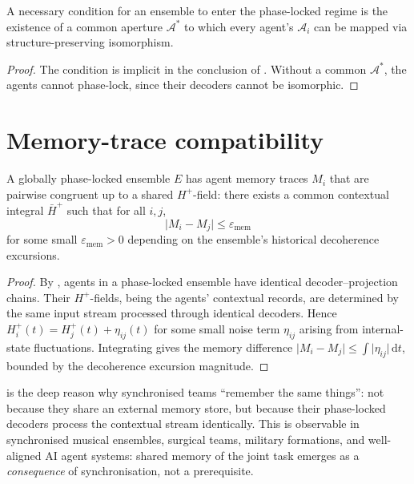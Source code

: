 \documentclass[11pt,twocolumn,a4paper]{article}
\newcommand{\Aper}{\mathcal{A}}
\newcommand{\eps}{\varepsilon}
\newcommand{\abs}[1]{\lvert#1\rvert}
\newcommand{\dd}{\,\mathrm{d}}
\begin{document}
\begin{corollary}\label{cor:aper-mediated}
A necessary condition for an ensemble to enter the phase-locked regime
is the existence of a common aperture
$\Aper^*$ to which every agent's $\Aper_i$ can be mapped via
structure-preserving isomorphism.
\end{corollary}

\begin{proof}
The condition is implicit in the conclusion of .
Without a common $\Aper^*$, the agents cannot phase-lock, since their
decoders cannot be isomorphic.
\end{proof}

\section{Memory-trace compatibility}
\label{sec:memory-compat}

\begin{theorem}\label{thm:mem-compat}
A globally phase-locked ensemble $E$ has agent memory traces $M_i$
that are pairwise congruent up to a shared $H^+$-field: there exists a
common contextual integral $\bar{H}^+$ such that for all $i,j$,
\[
\abs{M_i-M_j}\le\eps_{\mathrm{mem}}
\]
for some small $\eps_{\mathrm{mem}}>0$ depending on the ensemble's
historical decoherence excursions.
\end{theorem}

\begin{proof}
By , agents in a phase-locked ensemble have identical
decoder--projection chains. Their $H^+$-fields, being the agents'
contextual records, are determined by the same input stream
processed through identical decoders. Hence
$H^+_i(t)=H^+_j(t)+\eta_{ij}(t)$ for some small noise term $\eta_{ij}$
arising from internal-state fluctuations. Integrating gives the
memory difference $\abs{M_i-M_j}\le\int\abs{\eta_{ij}}\dd t$, bounded
by the decoherence excursion magnitude.
\end{proof}

\begin{remark}[Interpretation]\label{rem:mem-interp}
 is the deep reason why synchronised teams
``remember the same things'': not because they share an external memory
store, but because their phase-locked decoders process the contextual
stream identically. This is observable in synchronised musical
ensembles, surgical teams, military formations, and well-aligned AI
agent systems: shared memory of the joint task emerges as a
\emph{consequence} of synchronisation, not a prerequisite.
\end{remark}
\end{document}
